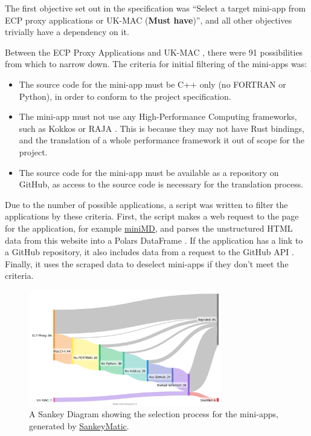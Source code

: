 The first objective set out in the specification was ``Select a target mini-app from ECP proxy applications or UK-MAC (\textbf{Must have})'', and all other objectives trivially have a dependency on it.

Between the ECP Proxy Applications \cite{ECPProxyApplications} and UK-MAC \cite{UKMiniAppConsortium}, there were 91 possibilities from which to narrow down. The criteria for initial filtering of the mini-apps was:
\begin{itemize}
    \item The source code for the mini-app must be C++ only (no FORTRAN or Python), in order to conform to the project specification.
    \item The mini-app must not use any High-Performance Computing frameworks, such as Kokkos \cite{KokkosEcosystem} or RAJA \cite{RAJAPortabilitySuite}. This is because they may not have Rust bindings, and the translation of a whole performance framework it out of scope for the project.
    \item The source code for the mini-app must be available as a repository on GitHub, as access to the source code is necessary for the translation process.
\end{itemize}

Due to the number of possible applications, a script was written to filter the applications by these criteria. First, the script makes a web request to the page for the application, for example \href{https://proxyapps.exascaleproject.org/app/minimd/}{miniMD}, and parses the unstructured HTML data from this website into a Polars DataFrame \cite{PolarsPolars2023}. If the application has a link to a GitHub repository, it also includes data from a request to the GitHub API \cite{GitHubRESTAPI}. Finally, it uses the scraped data to deselect mini-apps if they don't meet the criteria.

\begin{figure}[h]
    \centering
    \includegraphics[width=0.75\textwidth]{images/8_appendix/miniapp_sankey.png}
    \caption{A Sankey Diagram showing the selection process for the mini-apps, generated by \href{https://sankeymatic.com/build/}{SankeyMatic}.}
    \label{fig:miniapp_sankey}
\end{figure}

